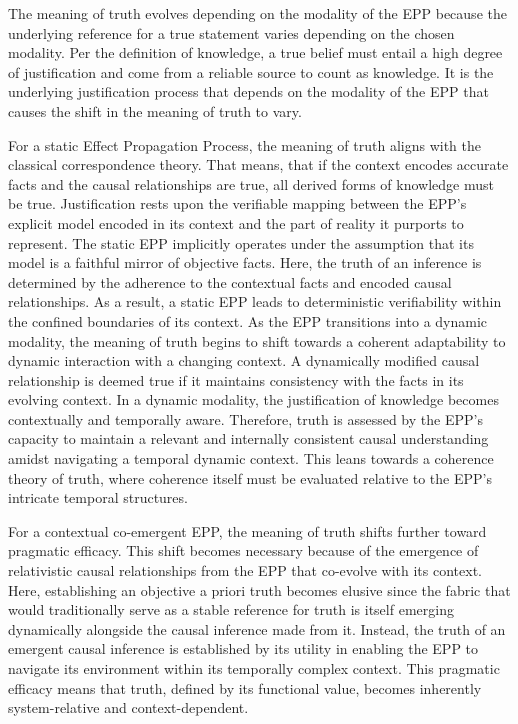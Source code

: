 The meaning of truth evolves depending on the modality of the EPP because the underlying reference for a true statement varies depending on the chosen modality. Per the definition of knowledge, a true belief must entail a high degree of justification and come from a reliable source to count as knowledge. It is the underlying justification process that depends on the modality of the EPP that causes the shift in the meaning of truth to vary.

For a static Effect Propagation Process, the meaning of truth aligns with the classical correspondence theory. That means, that if the context encodes accurate facts and the causal relationships are true, all derived forms of knowledge must be true.
Justification rests upon the verifiable mapping between the EPP's explicit model encoded in its context and the part of reality it purports to represent. The static EPP implicitly operates under the assumption that its model is a faithful mirror of objective facts. Here, the truth of an inference is determined by the adherence to the contextual facts and encoded causal relationships. As a result, a static EPP leads to deterministic verifiability within the confined boundaries of its context.
As the EPP transitions into a dynamic modality, the meaning of truth begins to shift towards a coherent adaptability to dynamic interaction with a changing context. A dynamically modified causal relationship is deemed true if it maintains consistency with the facts in its evolving context. In a dynamic modality,  the justification of knowledge becomes contextually and temporally aware. Therefore, truth is assessed by the EPP's capacity to maintain a relevant and internally consistent causal understanding amidst navigating a temporal dynamic context.  This leans towards a coherence theory of truth, where coherence itself must be evaluated relative to the EPP’s intricate temporal structures.


For a contextual co-emergent EPP, the meaning of truth shifts further toward pragmatic efficacy. This shift becomes necessary because of the emergence of relativistic causal relationships from the EPP that co-evolve with its context. Here, establishing an objective a priori truth becomes elusive since the fabric that would traditionally serve as a stable reference for truth is itself emerging dynamically alongside the causal inference made from it. Instead, the truth of an emergent causal inference is established by its utility in enabling the EPP to navigate its environment within its temporally complex context.
This pragmatic efficacy means that truth, defined by its functional value, becomes inherently system-relative and context-dependent.

